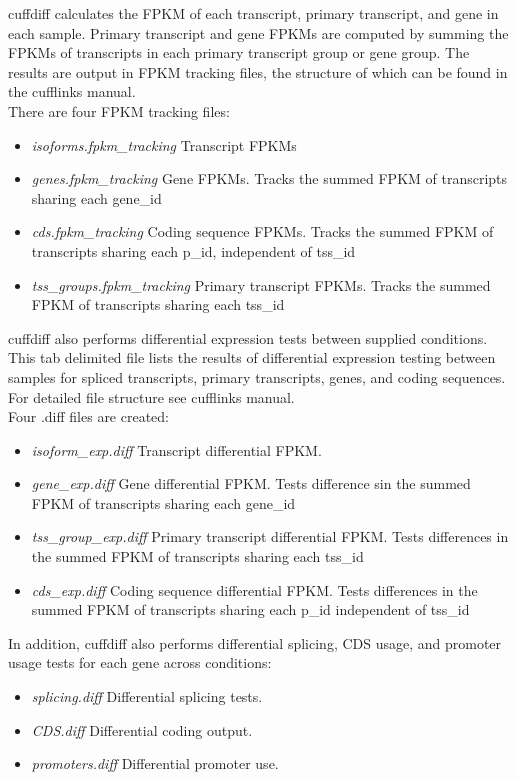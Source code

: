 \documentclass[10pt]{article}
\begin{document}
cuffdiff calculates the FPKM of each transcript, primary transcript, and gene in each sample. Primary transcript and gene FPKMs are computed by summing the FPKMs of transcripts in each primary transcript group or gene group. The results are output in FPKM tracking files, the structure of which can be found in the cufflinks manual.\\

There are four FPKM tracking files:
\begin{itemize}
	\item \emph{isoforms.fpkm\_tracking}	Transcript FPKMs
	\item \emph{genes.fpkm\_tracking}	Gene FPKMs. Tracks the summed FPKM of transcripts sharing each gene\_id
	\item \emph{cds.fpkm\_tracking}	Coding sequence FPKMs. Tracks the summed FPKM of transcripts sharing each p\_id, independent of tss\_id
	\item \emph{tss\_groups.fpkm\_tracking}	Primary transcript FPKMs. Tracks the summed FPKM of transcripts sharing each tss\_id
\end{itemize}

cuffdiff also performs differential expression tests between supplied conditions. This tab delimited file lists the results of differential expression testing between samples for spliced transcripts, primary transcripts, genes, and coding sequences. For detailed file structure see cufflinks manual. \\

Four .diff files are created:
\begin{itemize}
	\item \emph{isoform\_exp.diff}	Transcript differential FPKM.
	\item \emph{gene\_exp.diff}	Gene differential FPKM. Tests difference sin the summed FPKM of transcripts sharing each gene\_id
	\item \emph{tss\_group\_exp.diff}	Primary transcript differential FPKM. Tests differences in the summed FPKM of transcripts sharing each tss\_id
	\item \emph{cds\_exp.diff}	Coding sequence differential FPKM. Tests differences in the summed FPKM of transcripts sharing each p\_id independent of tss\_id
\end{itemize}

In addition, cuffdiff also performs differential splicing, CDS usage, and promoter usage tests for each gene across conditions:

\begin{itemize}
	\item \emph{splicing.diff}	Differential splicing tests.
	\item \emph{CDS.diff}	Differential coding output.
	\item \emph{promoters.diff}	Differential promoter use.
\end{itemize}
\end{document}
